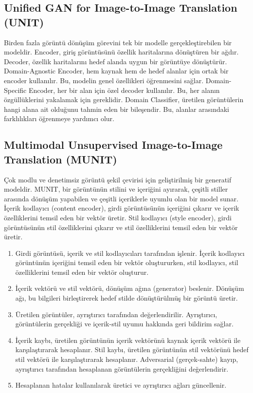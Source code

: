 \subsection{Unified GAN for Image-to-Image Translation (UNIT)}

Birden fazla görüntü dönüşüm görevini tek bir modelle gerçekleştirebilen bir modeldir. Encoder, giriş görüntüsünü özellik haritalarına dönüştüren bir ağdır. Decoder, özellik haritalarını hedef alanda uygun bir görüntüye dönüştürür. Domain-Agnostic Encoder, hem kaynak hem de hedef alanlar için ortak bir encoder kullanılır. Bu, modelin genel özellikleri öğrenmesini sağlar. Domain-Specific Encoder, her bir alan için özel decoder kullanılır. Bu, her alanın özgüllüklerini yakalamak için gereklidir. Domain Classifier, üretilen görüntülerin hangi alana ait olduğunu tahmin eden bir bileşendir. Bu, alanlar arasındaki farklılıkları öğrenmeye yardımcı olur. 

\subsection{Multimodal Unsupervised Image-to-Image Translation (MUNIT)}

Çok modlu ve denetimsiz görüntü şekil çevirisi için geliştirilmiş bir generatif modeldir. MUNIT, bir görüntünün stilini ve içeriğini ayırarak, çeşitli stiller arasında dönüşüm yapabilen ve çeşitli içeriklerle uyumlu olan bir model sunar. İçerik kodlayıcı (content encoder), girdi görüntüsünün içeriğini çıkarır ve içerik özelliklerini temsil eden bir vektör üretir. Stil kodlayıcı (style encoder), girdi görüntüsünün stil özelliklerini çıkarır ve stil özelliklerini temsil eden bir vektör üretir.

\begin{enumerate}
    \item Girdi görüntüsü, içerik ve stil kodlayıcıları tarafından işlenir. İçerik kodlayıcı görüntünün içeriğini temsil eden bir vektör oluştururken, stil kodlayıcı, stil özelliklerini temsil eden bir vektör oluşturur.
    \item İçerik vektörü ve stil vektörü, dönüşüm ağına (generator) beslenir. Dönüşüm ağı, bu bilgileri birleştirerek hedef stilde dönüştürülmüş bir görüntü üretir.
    \item Üretilen görüntüler, ayrıştırıcı tarafından değerlendirilir. Ayrıştırıcı, görüntülerin gerçekliği ve içerik-stil uyumu hakkında geri bildirim sağlar.
    \item İçerik kaybı, üretilen görüntünün içerik vektörünü kaynak içerik vektörü ile karşılaştırarak hesaplanır. Stil kaybı, üretilen görüntünün stil vektörünü hedef stil vektörü ile karşılaştırarak hesaplanır. Adversarial (gerçek-sahte) kayıp, ayrıştırıcı tarafından hesaplanan görüntülerin gerçekliğini değerlendirir.
    \item Hesaplanan hatalar kullanılarak üretici ve ayrıştırıcı ağları güncellenir.
\end{enumerate}

